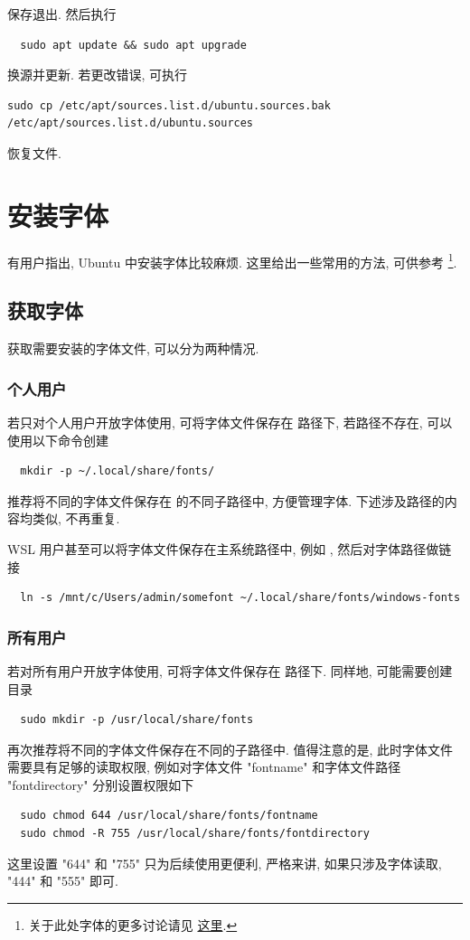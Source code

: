 保存退出.
然后执行
\begin{lstlisting}
  sudo apt update && sudo apt upgrade
\end{lstlisting}
换源并更新.
若更改错误,
可执行
\begin{lstlisting}[deletekeywords = apt]
  sudo cp /etc/apt/sources.list.d/ubuntu.sources.bak /etc/apt/sources.list.d/ubuntu.sources
\end{lstlisting}
恢复文件.

\section{安装字体}\label{sec:addition:font}

有用户指出,
Ubuntu 中安装字体比较麻烦.
这里给出一些常用的方法,
可供参考%
\footnote{关于此处字体的更多讨论请见%
  \href{https://github.com/OsbertWang/install-latex-guide-zh-cn/issues/75}{这里}.}.

\subsection{获取字体}

获取需要安装的字体文件,
可以分为两种情况.

\subsubsection{个人用户}

若只对个人用户开放字体使用,
可将字体文件保存在  路径下,
若路径不存在,
可以使用以下命令创建
\begin{lstlisting}
  mkdir -p ~/.local/share/fonts/
\end{lstlisting}
推荐将不同的字体文件保存在  的不同子路径中,
方便管理字体.
下述涉及路径的内容均类似,
不再重复.

WSL 用户甚至可以将字体文件保存在主系统路径中,
例如 ,
然后对字体路径做链接
\begin{lstlisting}
  ln -s /mnt/c/Users/admin/somefont ~/.local/share/fonts/windows-fonts
\end{lstlisting}

\subsubsection{所有用户}

若对所有用户开放字体使用,
可将字体文件保存在  路径下.
同样地,
可能需要创建目录
\begin{lstlisting}
  sudo mkdir -p /usr/local/share/fonts
\end{lstlisting}
再次推荐将不同的字体文件保存在不同的子路径中.
值得注意的是,
此时字体文件需要具有足够的读取权限,
例如对字体文件 "fontname" 和字体文件路径 "fontdirectory" 分别设置权限如下
\begin{lstlisting}
  sudo chmod 644 /usr/local/share/fonts/fontname
  sudo chmod -R 755 /usr/local/share/fonts/fontdirectory
\end{lstlisting}
这里设置 "644" 和 "755" 只为后续使用更便利,
严格来讲,
如果只涉及字体读取,
"444" 和 "555" 即可.

